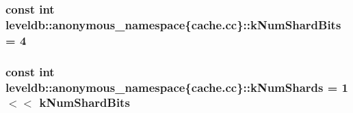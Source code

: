 \subsubsection[{k\+Num\+Shard\+Bits}]{\setlength{\rightskip}{0pt plus 5cm}const int leveldb\+::anonymous\+\_\+namespace\{cache.\+cc\}\+::k\+Num\+Shard\+Bits = 4\hspace{0.3cm}{\ttfamily [static]}}\label{namespaceleveldb_1_1anonymous__namespace_02cache_8cc_03_aa90d7390dc00417e1d35e7a6f58773a6}
\hypertarget{namespaceleveldb_1_1anonymous__namespace_02cache_8cc_03_aca0255908fd5069b4420e4f02d25bd1b}{}
\subsubsection[{k\+Num\+Shards}]{\setlength{\rightskip}{0pt plus 5cm}const int leveldb\+::anonymous\+\_\+namespace\{cache.\+cc\}\+::k\+Num\+Shards = 1 $<$$<$ {\bf k\+Num\+Shard\+Bits}\hspace{0.3cm}{\ttfamily [static]}}\label{namespaceleveldb_1_1anonymous__namespace_02cache_8cc_03_aca0255908fd5069b4420e4f02d25bd1b}
